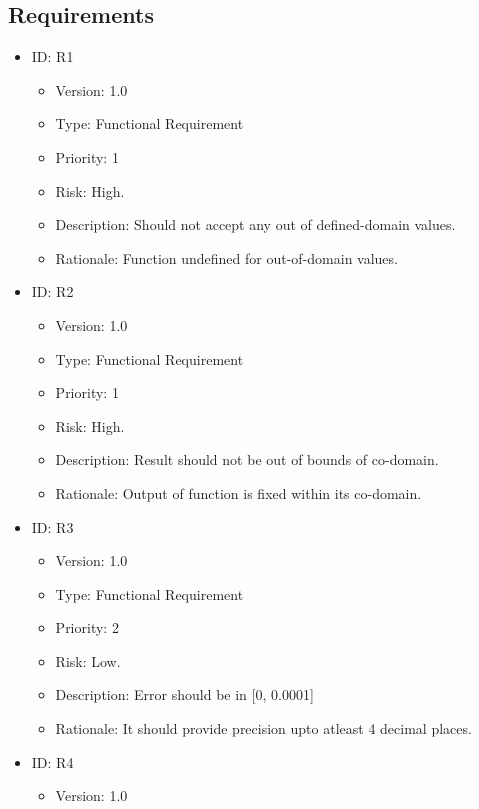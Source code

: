 \documentclass[a4paper,12pt]{article}
\begin{document}
    \subsection{Requirements}
    \begin{itemize}
        \item {ID: R1 
        \begin{itemize}
            \item {Version: 1.0}
            \item{Type: Functional Requirement}
            \item{Priority: 1}
            \item {Risk: High.}
            \item{Description: Should not accept any out of defined-domain values.}
            \item{Rationale: Function undefined for out-of-domain values.}
        \end{itemize}}
        \item {ID: R2 
        \begin{itemize}
            \item {Version: 1.0}
            \item{Type: Functional Requirement}
            \item{Priority: 1}
            \item {Risk: High.}
            \item{Description: Result should not be out of bounds of co-domain.}
            \item{Rationale: Output of function is fixed within its co-domain.}
        \end{itemize}}
        \item {ID: R3 
        \begin{itemize}
            \item {Version: 1.0}
            \item{Type: Functional Requirement}
            \item{Priority: 2}
            \item {Risk: Low.}
            \item{Description: Error should be in  [0, 0.0001] }
            \item{Rationale: It should provide precision upto atleast 4 decimal places.}
        \end{itemize}}
        \item {ID: R4 
        \begin{itemize}
            \item {Version: 1.0}

\end{itemize}}
\end{itemize}
\end{document}

